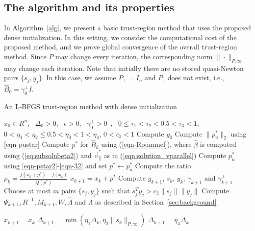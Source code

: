 \subsection{The algorithm and its properties}
In Algorithm~\ref{alg}, we present a basic trust-region method that
uses the proposed dense initialization. In this setting, we consider
the computational cost of the proposed method, and we prove global
convergence of the overall trust-region method.  Since $P$ may change
every iteration, the corresponding norm $\|\cdot\|_{P,\infty}$ may
change each iteration.  Note that initially there are no stored
quasi-Newton pairs $\{s_j,y_j\}$.  In this case, we assume $P_{\perp}
= I_n$ and $P_{\parallel}$ does not exist, i.e., $\hat{B}_0=\gamma_0^\perp
I$.

\begin{algorithm}[htp]
\caption{An L-BFGS trust-region method with dense initialization} \label{alg}
\begin{algorithmic}[1]
\REQUIRE $x_0\in R^n$, \ $\Delta_0>0$, \ $\epsilon > 0$, \ $\gamma_0^{\perp}>0$\
, \ $0 \leq \tau_1 < \tau_2< 0.5 < \tau_3<1$, \\
$0<\eta_1<\eta_2\leq 0.5<\eta_3<1<\eta_4$, $0 < c_3 < 1 $
\STATE Compute $g_0$
        \RETURN
        \ENDIF
        \STATE %
        Compute $\| p_u^* \|_2$ using \eqref{eqn-pustar}
              \STATE Compute $p^*$ for $\hat{B}_k$ using (\ref{eqn-Roummel}), where $\widehat{\beta}$ is computed using (\ref{eq:subsolnbeta2}) and $\vec{v}^*_{\parallel}$ as in (\ref{eqn:solution_vparallel})
        \ELSE
           \STATE Compute $p_u^*$ using \eqref{eqn-pstar2}-\eqref{eqn-32} and set $p^*\gets p_u^*$
        \ENDIF
        \STATE Compute the ratio $\rho_k = \frac{f(x_k+p^*)-f(x_k)}{Q(p^*)}$
        \IF{$\rho_k {\geq \tau_1}$}
                \STATE $x_{k+1}=x_k+p^*$
                \STATE Compute $g_{k+1}$, $s_k$, $y_k$, $\gamma_{k+1}$ and $\gamma_{k+1}^{\perp}$
        \STATE Choose at most $m$ pairs $\{s_j, y_j\}$ such that $ s_j^Ty_j > c_3 \| s_j \| \| y_j \| $
        \STATE Compute $\Psi_{k+1}, R^{-1}, M_{k+1}, W, \hat{\Lambda}$ and $\Lambda$ 
as described in Section~\ref{sec:background}

        \ELSE
                \STATE $x_{k+1} = x_k$
        \ENDIF
                \STATE $\Delta_{k+1} = \min \left({\eta_1}\Delta_k, {\eta_2}\|s_k\|_{P,\infty} \right)$
        \ELSE
                        \STATE $\Delta_{k+1} = {\eta_4} \Delta_k$
                \ELSE
                        \STATE{$\Delta_{k+1}=\Delta_k$}
                \ENDIF
        \ENDIF
\ENDFOR
\end{algorithmic}
\end{algorithm}

